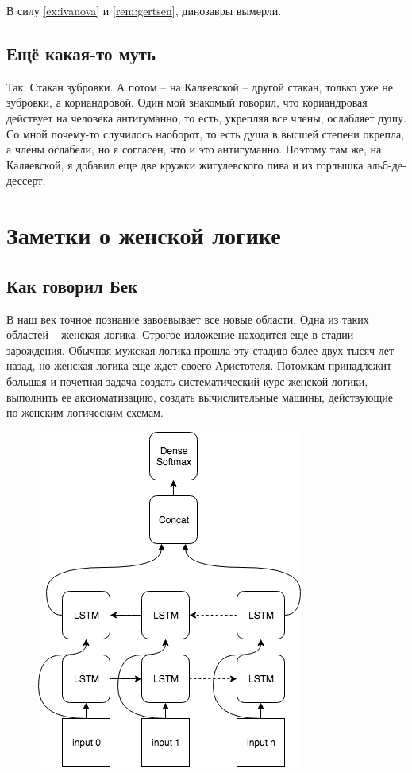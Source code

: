 \documentclass[14pt, a4paper, russian]{report}
\begin{document}
\begin{normalsize}
В силу \cref{ex:ivanova} и \cref{rem:gertsen}, динозавры вымерли.


\section{Ещё какая-то муть}
Так. Стакан зубровки. А потом – на Каляевской – другой стакан, только уже не зубровки, а кориандровой. Один мой знакомый говорил, что кориандровая действует на человека антигуманно, то есть, укрепляя все члены, ослабляет душу. Со мной почему-то случилось наоборот, то есть душа в высшей степени окрепла, а члены ослабели, но я согласен, что и это антигуманно. Поэтому там же, на Каляевской, я добавил еще две кружки жигулевского пива и из горлышка альб-де-дессерт.\cite{erofeev}



\chapter{Заметки о женской логике}
\section{Как говорил Бек}
В наш век точное познание завоевывает все новые области. Одна из таких областей – женская логика. Строгое изложение находится еще в стадии зарождения. Обычная мужская логика прошла эту стадию более двух тысяч лет назад, но женская логика еще ждет своего Аристотеля. Потомкам принадлежит большая и почетная задача создать систематический курс женской логики, выполнить ее аксиоматизацию, создать вычислительные машины, действующие по женским логическим схемам.\cite{bek}

\begin{figure}[H]
	\begin{center}
		 \includegraphics[width=0.5\linewidth]{Baseline}
	\end{center}
  

\end{figure}
\end{normalsize}
\end{document}
